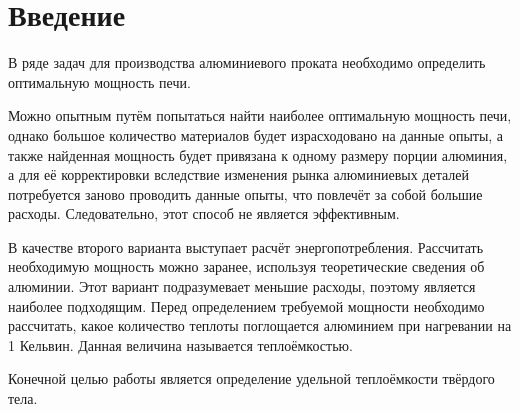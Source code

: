 \chapter{Введение}
\label{ch:intro}

    В ряде задач для производства алюминиевого проката необходимо определить оптимальную мощность печи.  
    
    Можно опытным путём попытаться найти наиболее оптимальную мощность печи, однако большое количество материалов будет израсходовано на данные опыты, а также найденная мощность будет привязана к одному размеру порции алюминия, а для её корректировки вследствие изменения рынка алюминиевых деталей потребуется заново проводить данные опыты, что повлечёт за собой большие расходы. Следовательно, этот способ не является эффективным.
    
    В качестве второго варианта выступает расчёт энергопотребления. Рассчитать необходимую мощность можно заранее, используя теоретические сведения об алюминии. Этот вариант подразумевает меньшие расходы, поэтому является наиболее подходящим. Перед определением требуемой мощности необходимо рассчитать, какое количество теплоты поглощается алюминием при нагревании на 1 Кельвин. Данная величина называется теплоёмкостью. 

    Конечной целью работы является определение удельной теплоёмкости твёрдого тела.

